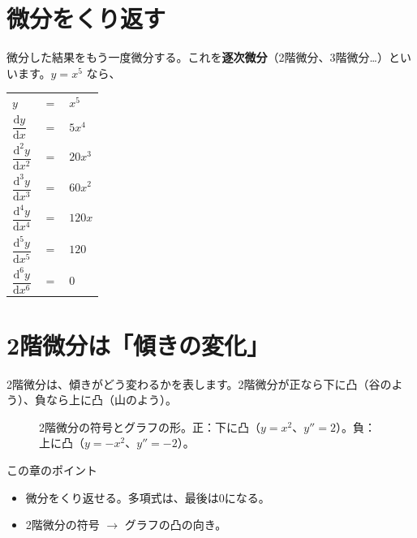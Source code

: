 \documentclass[a4paper,11pt,openany]{ltjsbook}
\newcommand{\dd}{\mathrm{d}}
\begin{document}
\section{微分をくり返す}

微分した結果をもう一度微分する。これを\textbf{逐次微分}（2階微分、3階微分…）といいます。$y=x^5$ なら、

\begin{center}
\begin{tabular}{lcl}
\toprule
$y$ & $=$ & $x^5$\\
$\dfrac{\dd y}{\dd x}$ & $=$ & $5x^4$\\
$\dfrac{\dd^2y}{\dd x^2}$ & $=$ & $20x^3$\\
$\dfrac{\dd^3y}{\dd x^3}$ & $=$ & $60x^2$\\
$\dfrac{\dd^4y}{\dd x^4}$ & $=$ & $120x$\\
$\dfrac{\dd^5y}{\dd x^5}$ & $=$ & $120$\\
$\dfrac{\dd^6y}{\dd x^6}$ & $=$ & $0$\\
\bottomrule
\end{tabular}
\end{center}

\section{2階微分は「傾きの変化」}

2階微分は、傾きがどう変わるかを表します。2階微分が正なら下に凸（谷のよう）、負なら上に凸（山のよう）。

\begin{figure}[htbp]
\centering
{}
\caption{2階微分の符号とグラフの形。正：下に凸（$y=x^2$、$y''=2$）。負：上に凸（$y=-x^2$、$y''=-2$）。}
\end{figure}

\begin{pointbox}{この章のポイント}
\begin{itemize}[leftmargin=1.5em]
\item 微分をくり返せる。多項式は、最後は0になる。
\item 2階微分の符号 $\to$ グラフの凸の向き。
\end{itemize}
\end{pointbox}
\end{document}
